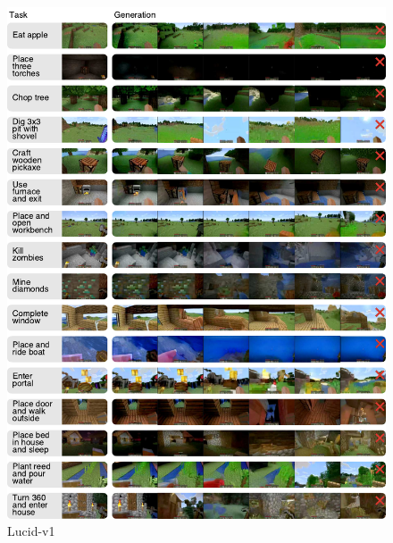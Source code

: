 \begin{figure}[h!]
\includegraphics[width=0.97\linewidth]{figures/wmtasks/lucid}
\caption{Lucid-v1}
\label{fig:wmtasks_lucid}
\end{figure}